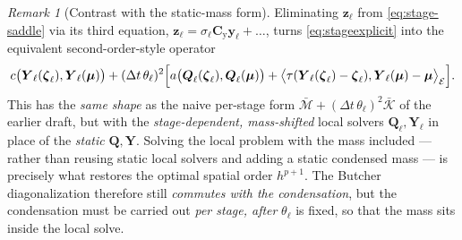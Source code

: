 \documentclass[11pt]{article}
\theoremstyle{remark}
\newtheorem*{remark}{Remark}
\renewcommand{\vec}{\boldsymbol}
\newcommand{\bvec}[1]{\vec{#1}}
\newcommand{\setEdge}{\mathcal E}        %
\newcommand{\Mbar}{\bar{\mathcal M}}     %
\newcommand{\Kbar}{\bar{\mathcal K}}     %
\newcommand{\Cy}{\mathbf{C}_{\mathrm y}} %
\newcommand{\dt}{\Delta t}
\begin{document}
\begin{remark}[Contrast with the static-mass form]\label{rem:contrast}
Eliminating $\bvec z_\ell$ from \eqref{eq:stage-saddle} via its third equation,
$\bvec z_\ell=\sigma_\ell\Cy\bvec y_\ell+\dots$, turns \eqref{eq:stageexplicit}
into the equivalent second-order-style operator
\begin{equation}\label{eq:stage-2nd}
  c\bigl(\bvec Y_\ell(\vec\zeta_\ell),\bvec Y_\ell(\bvec\mu)\bigr)
  +(\dt\,\theta_\ell)^2\Bigl[
      a\bigl(\bvec Q_\ell(\vec\zeta_\ell),\bvec Q_\ell(\bvec\mu)\bigr)
    + \bigl\langle\tau(\bvec Y_\ell(\vec\zeta_\ell)-\vec\zeta_\ell),
        \bvec Y_\ell(\bvec\mu)-\bvec\mu\bigr\rangle_\setEdge\Bigr].
\end{equation}
This has the \emph{same shape} as the naive per-stage form
$\Mbar+(\dt\,\theta_\ell)^2\Kbar$ of the earlier draft, but with the
\emph{stage-dependent, mass-shifted} local solvers $\bvec Q_\ell,\bvec Y_\ell$ in
place of the \emph{static} $\bvec Q,\bvec Y$. Solving the local problem with the
mass included --- rather than reusing static local solvers and adding a static
condensed mass --- is precisely what restores the optimal spatial order
$h^{p+1}$. The Butcher diagonalization therefore still \emph{commutes with the
condensation}, but the condensation must be carried out \emph{per stage, after}
$\theta_\ell$ is fixed, so that the mass sits inside the local solve.
\end{remark}
\end{document}
